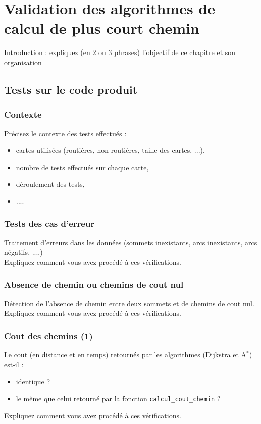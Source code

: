 \chapter{Validation des algorithmes de calcul de plus court chemin}

Introduction : expliquez (en 2 ou 3 phrases) l'objectif de ce chapitre et son organisation

\section{Tests sur le code produit}

\subsection{Contexte}
Précisez le contexte des tests effectués : 
\begin{itemize}
	\item cartes utilisées (routières, non routières, taille des cartes, ...),
	\item nombre de tests effectués sur chaque carte, 
	\item  déroulement des tests,
	\item ....
\end{itemize}

\subsection{Tests des cas d'erreur}
Traitement d'erreurs dans les données (sommets inexistants, arcs inexistants, arcs négatifs, ....)
\\
Expliquez comment vous avez procédé à ces vérifications.


\subsection{Absence de chemin ou chemins de cout nul}
Détection de l'absence de chemin entre deux sommets et de chemins de cout nul. 
\\
Expliquez comment vous avez procédé à ces vérifications.


\subsection{Cout des chemins (1)}
Le cout (en distance et en temps) retournés par les algorithmes (Dijkstra et A$^*$) est-il : 
\begin{itemize}
	\item identique ?
	\item le même que celui retourné par la fonction \texttt{calcul\_cout\_chemin} ?
\end{itemize}
Expliquez comment vous avez procédé à ces vérifications.
\newline

